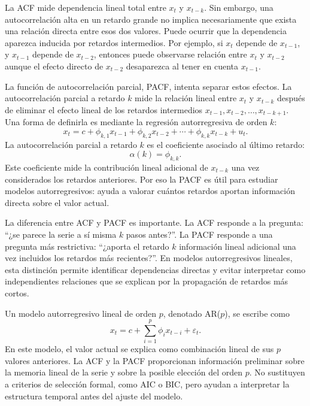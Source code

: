 La ACF mide dependencia lineal total entre \(x_t\) y \(x_{t-k}\). Sin embargo, una autocorrelación alta en un retardo grande no implica necesariamente que exista una relación directa entre esos dos valores. Puede ocurrir que la dependencia aparezca inducida por retardos intermedios. Por ejemplo, si \(x_t\) depende de \(x_{t-1}\), y \(x_{t-1}\) depende de \(x_{t-2}\), entonces puede observarse relación entre \(x_t\) y \(x_{t-2}\) aunque el efecto directo de \(x_{t-2}\) desaparezca al tener en cuenta \(x_{t-1}\).

La función de autocorrelación parcial, PACF, intenta separar estos efectos. La autocorrelación parcial a retardo \(k\) mide la relación lineal entre \(x_t\) y \(x_{t-k}\) después de eliminar el efecto lineal de los retardos intermedios \(x_{t-1},x_{t-2},\ldots,x_{t-k+1}\). Una forma de definirla es mediante la regresión autorregresiva de orden \(k\):
\begin{equation}
    x_t = c + \phi_{k,1}x_{t-1}+\phi_{k,2}x_{t-2}+\cdots+\phi_{k,k}x_{t-k}+u_t.
\end{equation}
La autocorrelación parcial a retardo \(k\) es el coeficiente asociado al último retardo:
\begin{equation}
    \alpha(k)=\phi_{k,k}.
\end{equation}
Este coeficiente mide la contribución lineal adicional de \(x_{t-k}\) una vez considerados los retardos anteriores. Por eso la PACF es útil para estudiar modelos autorregresivos: ayuda a valorar cuántos retardos aportan información directa sobre el valor actual.

La diferencia entre ACF y PACF es importante. La ACF responde a la pregunta: ``¿se parece la serie a sí misma \(k\) pasos antes?''. La PACF responde a una pregunta más restrictiva: ``¿aporta el retardo \(k\) información lineal adicional una vez incluidos los retardos más recientes?''. En modelos autorregresivos lineales, esta distinción permite identificar dependencias directas y evitar interpretar como independientes relaciones que se explican por la propagación de retardos más cortos.

Un modelo autorregresivo lineal de orden \(p\), denotado AR(\(p\)), se escribe como
\begin{equation}
    x_t = c+\sum_{i=1}^{p}\phi_i x_{t-i}+\varepsilon_t.
\end{equation}
En este modelo, el valor actual se explica como combinación lineal de sus \(p\) valores anteriores. La ACF y la PACF proporcionan información preliminar sobre la memoria lineal de la serie y sobre la posible elección del orden \(p\). No sustituyen a criterios de selección formal, como AIC o BIC, pero ayudan a interpretar la estructura temporal antes del ajuste del modelo.

